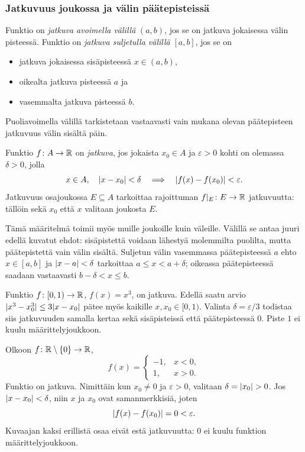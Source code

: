 \documentclass[11pt,a4paper]{amsart}
\begin{document}
\newpage
\subsubsection*{Jatkuvuus joukossa ja välin päätepisteissä}

\begin{definition}
  Funktio on \emph{jatkuva avoimella välillä} $(a,b)$, jos se on
  jatkuva jokaisessa välin pisteessä. Funktio on
  \emph{jatkuva suljetulla välillä} $[a,b]$, jos se on
  \begin{itemize}
    \item jatkuva jokaisessa sisäpisteessä $x\in(a,b)$,
    \item oikealta jatkuva pisteessä $a$ ja
    \item vasemmalta jatkuva pisteessä $b$.
  \end{itemize}
  Puoliavoimella välillä tarkistetaan vastaavasti vain mukana
  olevan päätepisteen jatkuvuus välin sisältä päin.
\end{definition}

\begin{definition}
  Funktio $f\colon A\to\mathbb{R}$ on \emph{jatkuva}, jos jokaista
  $x_0\in A$ ja $\varepsilon>0$ kohti on olemassa $\delta>0$, jolla
  \[
    x\in A,\quad\lvert x-x_0\rvert<\delta
    \quad\Longrightarrow\quad\lvert f(x)-f(x_0)\rvert<\varepsilon.
  \]
  Jatkuvuus osajoukossa $E\subseteq A$ tarkoittaa rajoittuman
  $f|_E\colon E\to\mathbb{R}$ jatkuvuutta: tällöin sekä $x_0$ että $x$
  valitaan joukosta $E$.
\end{definition}

Tämä määritelmä toimii myös muille joukoille kuin väleille.
Välillä se antaa juuri edellä kuvatut ehdot: sisäpistettä voidaan
lähestyä molemmilta puolilta, mutta päätepistettä vain välin sisältä.
Suljetun välin vasemmassa päätepisteessä $a$ ehto
$x\in[a,b]$ ja $\lvert x-a\rvert<\delta$ tarkoittaa $a\le x<a+\delta$;
oikeassa päätepisteessä saadaan vastaavasti $b-\delta<x\le b$.

\begin{example}
  Funktio $f\colon[0,1)\to\mathbb{R}$, $f(x)=x^3$, on jatkuva.
  Edellä saatu arvio $\lvert x^3-x_0^3\rvert\le3\lvert x-x_0\rvert$ pätee
  myös kaikille $x,x_0\in[0,1)$. Valinta $\delta=\varepsilon/3$
  todistaa siis jatkuvuuden samalla kertaa sekä sisäpisteissä
  että päätepisteessä $0$. Piste $1$ ei kuulu määrittelyjoukkoon.
\end{example}

\begin{example}
  Olkoon $f\colon\mathbb{R}\setminus\{0\}\to\mathbb{R}$,
  \[
    f(x)=
    \begin{cases}-1,&x<0,\\1,&x>0.
    \end{cases}
  \]
  Funktio on jatkuva. Nimittäin kun $x_0\ne0$ ja
  $\varepsilon>0$, valitaan $\delta=\lvert x_0\rvert>0$.
  Jos $\lvert x-x_0\rvert<\delta$, niin $x$ ja $x_0$ ovat samanmerkkisiä,
  joten
  \[
    \lvert f(x)-f(x_0)\rvert=0<\varepsilon.
  \]
  Kuvaajan kaksi erillistä osaa eivät estä jatkuvuutta:
  $0$ ei kuulu funktion määrittelyjoukkoon.
\end{example}
\end{document}
